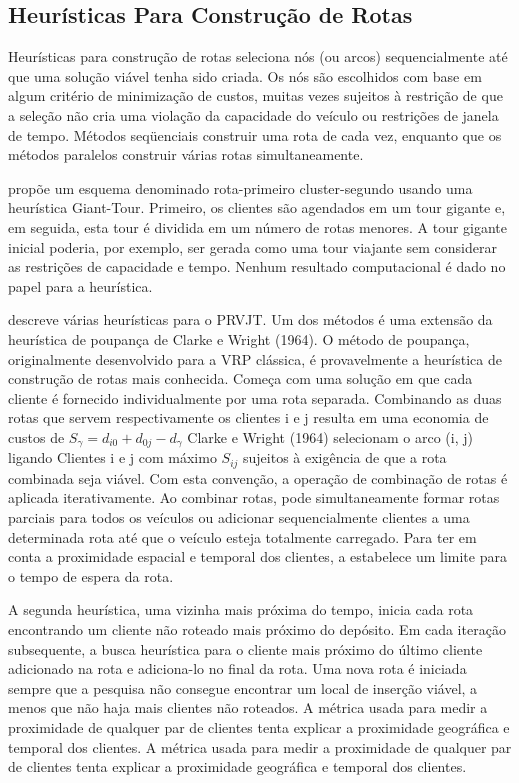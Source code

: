  
\subsection{Heurísticas Para Construção de Rotas }


Heurísticas para construção de rotas seleciona nós (ou arcos) sequencialmente até que uma solução viável tenha sido criada. Os nós são escolhidos com base em algum critério de minimização de custos, muitas vezes sujeitos à restrição de que a seleção não cria uma violação da capacidade do veículo ou restrições de janela de tempo. Métodos seqüenciais construir uma rota de cada vez, enquanto que os métodos paralelos construir várias rotas simultaneamente.



\cite{solomon87} propõe um esquema denominado rota-primeiro cluster-segundo usando uma heurística Giant-Tour. Primeiro, os clientes são agendados em um tour gigante e, em seguida, esta tour é dividida em um número de rotas menores. A tour gigante inicial poderia, por exemplo, ser gerada como uma tour viajante sem considerar as restrições de capacidade e tempo. Nenhum resultado computacional é dado no papel para a heurística.


\cite{solomon87} descreve várias heurísticas para o PRVJT. Um dos métodos é uma extensão da heurística de poupança de Clarke e Wright (1964). O método de poupança, originalmente desenvolvido para a VRP clássica, é provavelmente a heurística de construção de rotas mais conhecida. Começa com uma solução em que cada cliente é fornecido individualmente por uma rota separada. Combinando as duas rotas que servem respectivamente os clientes i e j resulta em uma economia de custos de $ S_\gamma = d_{i0} + d_{0j} -d_\gamma $ Clarke e Wright (1964) selecionam o arco (i, j) ligando Clientes i e j com máximo $ S_ {ij} $ sujeitos à exigência de que a rota combinada seja viável. Com esta convenção, a operação de combinação de rotas é aplicada iterativamente. Ao combinar rotas, pode simultaneamente formar rotas parciais para todos os veículos ou adicionar sequencialmente clientes a uma determinada rota até que o veículo esteja totalmente carregado. Para ter em conta a proximidade espacial e temporal dos clientes, a \cite{solomon87} estabelece um limite para o tempo de espera da rota. 


A segunda heurística, uma vizinha mais próxima do tempo, inicia cada rota encontrando um cliente não roteado mais próximo do depósito. Em cada iteração subsequente, a busca heurística para o cliente mais próximo do último cliente adicionado na rota e adiciona-lo no final da rota. Uma nova rota é iniciada sempre que a pesquisa não consegue encontrar um local de inserção viável, a menos que não haja mais clientes não roteados. A métrica usada para medir a proximidade de qualquer par de clientes tenta explicar a proximidade geográfica e temporal dos clientes. A métrica usada para medir a proximidade de qualquer par de clientes tenta explicar a proximidade geográfica e temporal dos clientes.


